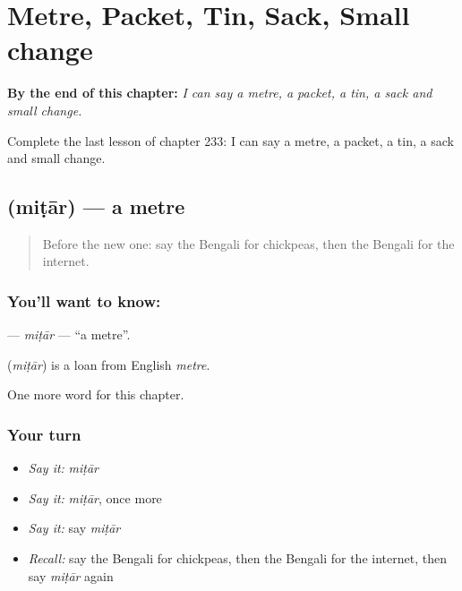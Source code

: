 
\chapter{Metre, Packet, Tin, Sack, Small change}
\label{ch:bn-metre-packet-tin-sack-small-change}

\begin{chapteropening}
\textbf{By the end of this chapter:} \emph{I can say a metre, a packet, a tin, a sack and small change.}

Complete the last lesson of chapter 233: I can say a metre, a packet, a tin, a sack and small change.
\end{chapteropening}

\section[\texorpdfstring{\bn{মিটার} (miṭār)}{মিটার (miṭār)}]{ (miṭār) — a metre}

\label{lesson:BN-C233-mitar}



\begin{quote}
Before the new one: say the Bengali for chickpeas, then the Bengali for the internet.
\end{quote}

\subsection*{You'll want to know: }
\textbf{} — \emph{miṭār} — \textquotedblleft{}a metre\textquotedblright{}.

\begin{cousinweb}
\textbf{} (\emph{miṭār}) is a loan from English \emph{metre}.
\end{cousinweb}

\begin{grammarlens}[title={What you've built}]
One more word for this chapter.
\end{grammarlens}

\subsection*{Your turn}
\begin{itemize}
\raggedright
  \item \emph{Say it:} \emph{miṭār}
  \item \emph{Say it:} \emph{miṭār}, once more
  \item \emph{Say it:} say \emph{miṭār}
  \item \emph{Recall:} say the Bengali for chickpeas, then the Bengali for the internet, then say \emph{miṭār} again
\end{itemize}

